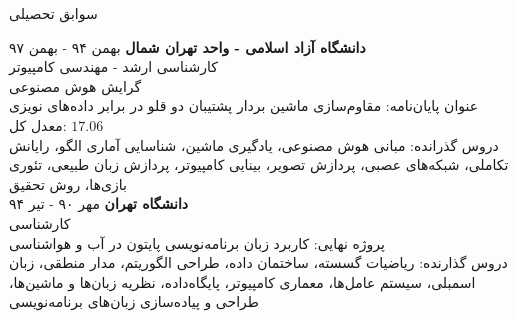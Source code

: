 \documentclass{resume} %
\begin{document}
\begin{rSection}{سوابق تحصیلی}

{\textbf{دانشگاه آزاد اسلامی - واحد تهران شمال}} \hfill {بهمن ۹۴ - بهمن ۹۷} \\ 
کارشناسی ارشد - مهندسی کامپیوتر \\
گرایش هوش مصنوعی \smallskip \\
عنوان پایان‌نامه: مقاوم‌سازی ماشین بردار پشتیبان دو قلو در برابر داده‌های نویزی \\
معدل کل: $17.06$ \\
دروس گذرانده: مبانی هوش مصنوعی، یادگیری ماشین، شناسایی آماری الگو، رایانش تکاملی، شبکه‌های عصبی، پردازش تصویر، بینایی کامپیوتر، پردازش زبان طبیعی، تئوری بازی‌ها، روش تحقیق \\


%
{\textbf{دانشگاه تهران}} \hfill {مهر ۹۰ - تیر ۹۴} \\
کارشناسی \\
پروژه نهایی: کاربرد زبان برنامه‌نویسی پایتون در آب ‌و ‌هواشناسی \\
دروس گذارنده: ریاضیات گسسته، ساختمان داده، طراحی الگوریتم، مدار منطقی، زبان اسمبلی، سیستم عامل‌ها، معماری کامپیوتر، پایگاه‌داده، نظریه زبان‌ها و ماشین‌ها، طراحی و پیاده‌سازی زبان‌های برنامه‌نویسی \\
\end{rSection}
%
\end{document}
